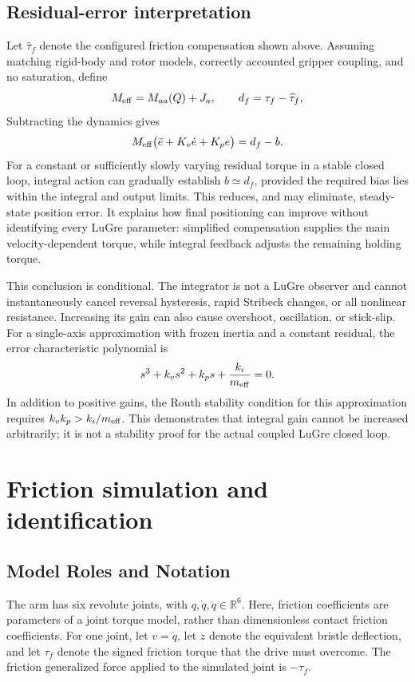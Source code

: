 \documentclass[11pt,a4paper]{report}
\begin{document}
\section{Residual-error interpretation}
Let $\widehat\tau_f$ denote the configured friction compensation shown above. Assuming matching rigid-body and rotor models, correctly accounted gripper coupling, and no saturation, define
\begin{equation}
 M_{\rm eff}=M_{aa}(Q)+J_a,\qquad
 d_f=\tau_f-\widehat\tau_f,
\end{equation}
Subtracting the dynamics gives
\begin{equation}
 M_{\rm eff}\bigl(\ddot e+K_v\dot e+K_pe\bigr)=d_f-b.
 \label{eq:error}
\end{equation}
For a constant or sufficiently slowly varying residual torque in a stable closed loop, integral action can gradually establish $b\simeq d_f$, provided the required bias lies within the integral and output limits. This reduces, and may eliminate, steady-state position error. It explains how final positioning can improve without identifying every LuGre parameter: simplified compensation supplies the main velocity-dependent torque, while integral feedback adjusts the remaining holding torque.

This conclusion is conditional. The integrator is not a LuGre observer and cannot instantaneously cancel reversal hysteresis, rapid Stribeck changes, or all nonlinear resistance. Increasing its gain can also cause overshoot, oscillation, or stick-slip. For a single-axis approximation with frozen inertia and a constant residual, the error characteristic polynomial is
\begin{equation}
 s^3+k_vs^2+k_ps+\frac{k_i}{m_{\rm eff}}=0.
\end{equation}
In addition to positive gains, the Routh stability condition for this approximation requires $k_vk_p>k_i/m_{\rm eff}$. This demonstrates that integral gain cannot be increased arbitrarily; it is not a stability proof for the actual coupled LuGre closed loop.

\chapter{Friction simulation and identification}\label{ch:friction}
\section{Model Roles and Notation}
The arm has six revolute joints, with $q,\dot q,\ddot q\in\mathbb R^6$. Here, friction coefficients are parameters of a joint torque model, rather than dimensionless contact friction coefficients. For one joint, let $v=\dot q$, let $z$ denote the equivalent bristle deflection, and let $\tau_f$ denote the signed friction torque that the drive must overcome. The friction generalized force applied to the simulated joint is $-\tau_f$.
\end{document}

